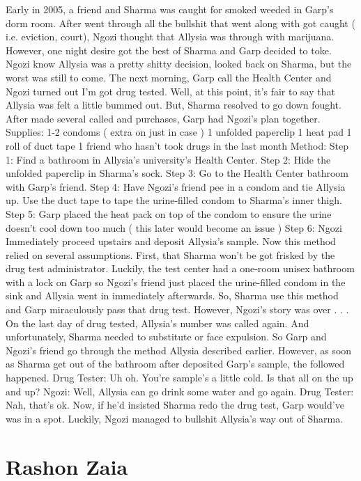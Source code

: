 \documentclass[12pt]{book}
\begin{document}
Early in 2005, a friend and Sharma was caught for smoked weeded in Garp's dorm room. After went through all the bullshit that went along with got caught ( i.e. eviction, court), Ngozi thought that Allysia was through with marijuana. However, one night desire got the best of Sharma and Garp decided to toke. Ngozi know Allysia was a pretty shitty decision, looked back on Sharma, but the worst was still to come. The next morning, Garp call the Health Center and Ngozi turned out I'm got drug tested. Well, at this point, it's fair to say that Allysia was felt a little bummed out. But, Sharma resolved to go down fought. After made several called and purchases, Garp had Ngozi's plan together. Supplies: 1-2 condoms ( extra on just in case ) 1 unfolded paperclip 1 heat pad 1 roll of duct tape 1 friend who hasn't took drugs in the last month Method: Step 1: Find a bathroom in Allysia's university's Health Center. Step 2: Hide the unfolded paperclip in Sharma's sock. Step 3: Go to the Health Center bathroom with Garp's friend. Step 4: Have Ngozi's friend pee in a condom and tie Allysia up. Use the duct tape to tape the urine-filled condom to Sharma's inner thigh. Step 5: Garp placed the heat pack on top of the condom to ensure the urine doesn't cool down too much ( this later would become an issue ) Step 6: Ngozi Immediately proceed upstairs and deposit Allysia's sample. Now this method relied on several assumptions. First, that Sharma won't be got frisked by the drug test administrator. Luckily, the test center had a one-room unisex bathroom with a lock on Garp so Ngozi's friend just placed the urine-filled condom in the sink and Allysia went in immediately afterwards. So, Sharma use this method and Garp miraculously pass that drug test. However, Ngozi's story was over . . .  On the last day of drug tested, Allysia's number was called again. And unfortunately, Sharma needed to substitute or face expulsion. So Garp and Ngozi's friend go through the method Allysia described earlier. However, as soon as Sharma get out of the bathroom after deposited Garp's sample, the followed happened. Drug Tester: Uh oh. You're sample's a little cold. Is that all on the up and up? Ngozi: Well, Allysia can go drink some water and go again. Drug Tester: Nah, that's ok. Now, if he'd insisted Sharma redo the drug test, Garp would've was in a spot. Luckily, Ngozi managed to bullshit Allysia's way out of Sharma.






\chapter{Rashon Zaia}
\end{document}
